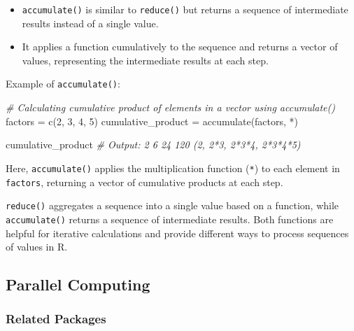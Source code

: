 \documentclass[
]{article}
\newenvironment{Shaded}{}{}
\newcommand{\AttributeTok}[1]{\textcolor[rgb]{0.49,0.56,0.16}{#1}}
\newcommand{\CommentTok}[1]{\textcolor[rgb]{0.38,0.63,0.69}{\textit{#1}}}
\newcommand{\DecValTok}[1]{\textcolor[rgb]{0.25,0.63,0.44}{#1}}
\newcommand{\FunctionTok}[1]{\textcolor[rgb]{0.02,0.16,0.49}{#1}}
\newcommand{\NormalTok}[1]{#1}
\newcommand{\OtherTok}[1]{\textcolor[rgb]{0.00,0.44,0.13}{#1}}
\newcommand{\StringTok}[1]{\textcolor[rgb]{0.25,0.44,0.63}{#1}}
\begin{document}
\begin{enumerate}
  \begin{itemize}
  \item
    \texttt{accumulate()} is similar to \texttt{reduce()} but returns a
    sequence of intermediate results instead of a single value.
  \item
    It applies a function cumulatively to the sequence and returns a
    vector of values, representing the intermediate results at each
    step.
  \end{itemize}

  Example of \texttt{accumulate()}:

\begin{Shaded}
\begin{Highlighting}[]
\CommentTok{\# Calculating cumulative product of elements in a vector using accumulate()}
\NormalTok{factors }\OtherTok{=} \FunctionTok{c}\NormalTok{(}\DecValTok{2}\NormalTok{, }\DecValTok{3}\NormalTok{, }\DecValTok{4}\NormalTok{, }\DecValTok{5}\NormalTok{)}
\NormalTok{cumulative\_product }\OtherTok{=} \FunctionTok{accumulate}\NormalTok{(factors, }\StringTok{\textasciigrave{}}\AttributeTok{*}\StringTok{\textasciigrave{}}\NormalTok{)}

\NormalTok{cumulative\_product}
\CommentTok{\# Output: 2 6 24 120 (2, 2*3, 2*3*4, 2*3*4*5)}
\end{Highlighting}
\end{Shaded}

  Here, \texttt{accumulate()} applies the multiplication function
  (\texttt{*}) to each element in \texttt{factors}, returning a vector
  of cumulative products at each step.
\end{enumerate}

\texttt{reduce()} aggregates a sequence into a single value based on a
function, while \texttt{accumulate()} returns a sequence of intermediate
results. Both functions are helpful for iterative calculations and
provide different ways to process sequences of values in R.

\hypertarget{parallel-computing}{%
\subsection{Parallel Computing}\label{parallel-computing}}

\hypertarget{related-packages}{%
\subsubsection{Related Packages}\label{related-packages}}
\end{document}
